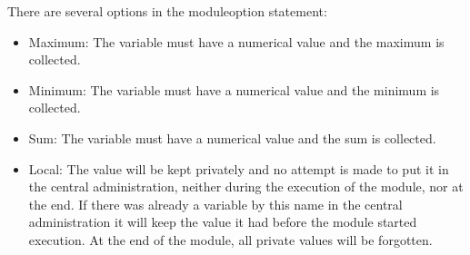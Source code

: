 There are several options in the moduleoption statement:
\begin{itemize}
\item Maximum: The variable must have a 
numerical value and the maximum is collected.
\item Minimum: The variable must have a 
numerical value and the minimum is collected.
\item Sum: The variable must have a numerical value 
and the sum is collected.
\item Local: The value will be kept privately and 
no attempt is made to put it in the central administration, neither during 
the execution of the module, nor at the end. If there was already a 
variable by this name in the central administration it will keep the value 
it had before the module started execution. At the end of the module, all 
private values will be forgotten.
\end{itemize}


